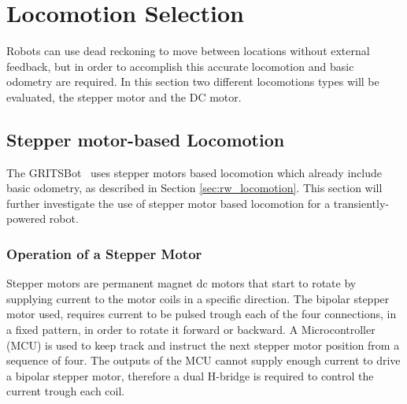 \section{Locomotion Selection}
\label{sec:pre_locomotion_selection}

Robots can use dead reckoning to move between locations without external feedback, but in order to accomplish this accurate locomotion and basic odometry are required.
In this section two different locomotions types will be evaluated, the stepper motor and the DC motor.

\subsection{Stepper motor-based Locomotion}

The GRITSBot~\cite{pickem_icra_2015} uses stepper motors based locomotion which already include basic odometry, as described in Section \ref{sec:rw_locomotion}.
This section will further investigate the use of stepper motor based locomotion for a transiently-powered robot.

\subsubsection{Operation of a Stepper Motor}
Stepper motors are permanent magnet dc motors that start to rotate by supplying current to the motor coils in a specific direction.
The bipolar stepper motor used, requires current to be pulsed trough each of the four connections, in a fixed pattern, in order to rotate it forward or backward.
A Microcontroller (MCU) is used to keep track and instruct the next stepper motor position from a sequence of four.
The outputs of the MCU cannot supply enough current to drive a bipolar stepper motor, therefore a dual H-bridge is required to control the current trough each coil.

